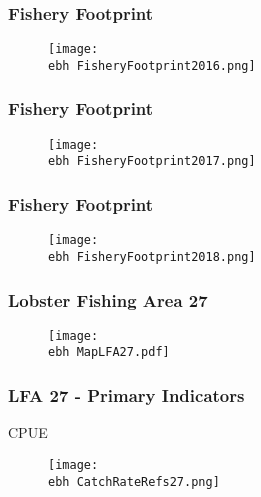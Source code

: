 \documentclass{beamer}
\newcommand{\ebh}{\string~/bio.data/bio.lobster/figures/Assessment/LFA2732/} %
\begin{document}
\begin{frame}
\frametitle{Fishery Footprint}
\begin{figure}
        \begin{center}
            \texttt{[image: \\ebh FisheryFootprint2016.png]}
        \end{center}
    \end{figure}
\end{frame}




\begin{frame}
\frametitle{Fishery Footprint}
\begin{figure}
        \begin{center}
            \texttt{[image: \\ebh FisheryFootprint2017.png]}
        \end{center}
    \end{figure}
\end{frame}




\begin{frame}
\frametitle{Fishery Footprint}
\begin{figure}
        \begin{center}
            \texttt{[image: \\ebh FisheryFootprint2018.png]}
        \end{center}
    \end{figure}
\end{frame}




\begin{frame}
\frametitle{Lobster Fishing Area 27}
\begin{figure}
        \begin{center}
            \texttt{[image: \\ebh MapLFA27.pdf]}
        \end{center}
    \end{figure}
\end{frame}


\begin{frame}
\frametitle{LFA 27 - Primary Indicators}
CPUE
\begin{figure}
        \begin{center}
            \texttt{[image: \\ebh CatchRateRefs27.png]}
        \end{center}
    \end{figure}
\end{frame}
\end{document}
